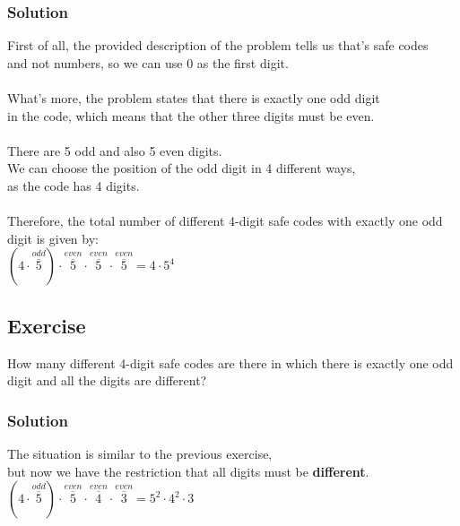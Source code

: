 \documentclass{article}
\begin{document}
\subsubsection*{Solution}
First of all, the provided description of the problem tells us that's safe codes\\
and not numbers, so we can use 0 as the first digit.\\
\\
What's more, the problem states that there is exactly one odd digit\\
in the code, which means that the other three digits must be even.\\
\\
There are 5 odd and also 5 even digits.
\\
We can choose the position of the odd digit in 4 different ways,\\
as the code has 4 digits.\\
\\
Therefore, the total number of different 4-digit safe codes with exactly one odd digit is given by:\\
$(4 \cdot \overset{odd}{\overline{5}}) \cdot \overset{even}{\overline{5}} \cdot \overset{even}{\overline{5}} \cdot \overset{even}{\overline{5}} = 4 \cdot 5^4$
\subsection{Exercise}
How many different 4-digit safe codes are there in which there is exactly one odd digit and all the digits are different?
\subsubsection*{Solution}
The situation is similar to the previous exercise,\\
but now we have the restriction that all digits must be \textbf{different}.\\
$(4 \cdot \overset{odd}{\overline{5}}) \cdot \overset{even}{\overline{5}} \cdot \overset{even}{\overline{4}} \cdot \overset{even}{\overline{3}} = 5^2 \cdot 4^2 \cdot 3$
\end{document}
